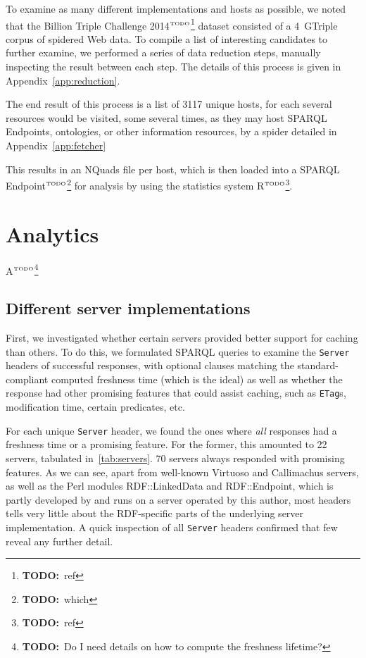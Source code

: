 \documentclass{article}
\newcommand{\httph}[1]{\texttt{#1}}
\newcommand{\todo}[1]{\ensuremath{^{\textrm{\tiny{TODO}\normalsize}}}\footnote{\textbf{TODO:}~#1}}
\begin{document}
To examine as many different implementations and hosts as possible, we
noted that the Billion Triple Challenge 2014\todo{ref} dataset
consisted of a 4~GTriple corpus of spidered Web data. To compile a
list of interesting candidates to further examine, we performed a
series of data reduction steps, manually inspecting the result between
each step. The details of this process is given in
Appendix~\ref{app:reduction}.

The end result of this process is a list of 3117 unique hosts, for
each several resources would be visited, some several times, as they
may host SPARQL Endpoints, ontologies, or other information resources,
by a spider detailed in Appendix~\ref{app:fetcher}

This results in an NQuads file per host, which is then loaded into a
SPARQL Endpoint\todo{which} for analysis by using the statistics
system R\todo{ref}.

\section{Analytics}

A\todo{Do I need details on how to compute the freshness lifetime?}

\subsection{Different server implementations}

First, we investigated whether certain servers provided better support
for caching than others. To do this, we formulated SPARQL queries to
examine the \httph{Server} headers of successful responses, with
optional clauses matching the standard-compliant computed freshness
time (which is the ideal) as well as whether the response had other
promising features that could assist caching, such as \httph{ETag}s,
modification time, certain predicates, etc.

For each unique \httph{Server} header, we found the ones where
\emph{all} responses had a freshness time or a promising feature. For
the former, this amounted to 22 servers, tabulated
in~\ref{tab:servers}. 70 servers always responded with promising
features. As we can see, apart from well-known Virtuoso and
Callimachus servers, as well as the Perl modules RDF::LinkedData and
RDF::Endpoint, which is partly developed by and runs on a server
operated by this author, most headers tells very little about the
RDF-specific parts of the underlying server implementation. A quick
inspection of all \httph{Server} headers confirmed that few reveal any
further detail.
\end{document}
